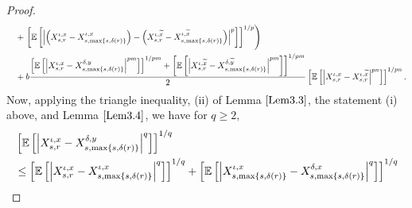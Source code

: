 \documentclass[11pt]{article}
\theoremstyle{theorem}
\theoremstyle{definition}
\newcommand{\1}{{\bf 1}}
\begin{document}
\begin{proof}
\begin{align}
& \quad +  \left. \left[\mathbb{E}\left[\left|\left(X^{\iota, x}_{s,r}-X^{\iota,x}_{s,\max\{s, \delta(r)\}}\right) - \left(X^{\iota, \widetilde{x}}_{s,r}-X^{\iota, \widetilde{x}}_{s,\max\{s, \delta(r)\}}\right)\right|^p\right]\right]^{1/p} \right)  \notag\\ 
  & \quad + b \dfrac{\left[\mathbb{E}\left[\left|X^{\iota, x}_{s,r}-X^{\delta,y}_{s,\max\{s, \delta(r)\}}\right|^{pm}\right]\right]^{1/pm} + \left[\mathbb{E} \left[\left|X^{\iota, \widetilde{x}}_{s,r}-X^{\delta, \widetilde{y}}_{s,\max\{s, \delta(r)\}}\right|^{pm}\right]\right]^{1/pm}}{2} \left[\mathbb{E}\left[\left|X^{\iota, x}_{s,r} - X^{\iota, \widetilde{x} }_{s,r}\right|^{pn}\right]\right]^{1/pn}.
    \label{v2.1}
\end{align}
Now, applying the triangle inequality, (ii) of Lemma $\ref{Lem3.3}$, the statement (i) above, and Lemma $\ref{Lem3.4}$, we have for $q \ge 2,$ 
\begin{align}
&\left[\mathbb{E}\left[\left|X^{\iota, x}_{s,r}-X^{\delta, y}_{s,\max\{s, \delta(r)\}}\right|^q\right]\right]^{1/q} \notag\\ 
& \leq \left[\mathbb{E}\left[\left|X^{\iota, x}_{s,r}-X^{\iota, x}_{s,\max\{s, \delta(r)\}}\right|^q\right]\right]^{1/q} + \left[\mathbb{E}\left[\left|X^{\iota, x}_{s,\max\{s, \delta(r)\}} - X^{\delta, x}_{s,\max\{s, \delta(r)\}}\right|^q\right]\right]^{1/q} \notag\\ 

\end{align}
\end{proof}
\end{document}
